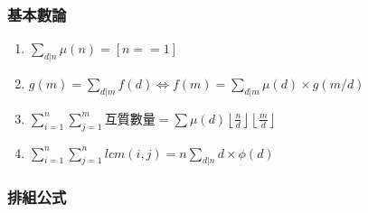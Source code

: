 \subsubsection{基本數論}
\begin{enumerate}\itemsep = -3pt
	\item $\sum_{d|n} \mu (n)=[n==1]$
	\item $g(m)=\sum_{d|m}f(d)\Leftrightarrow f(m)=\sum_{d|m}\mu (d) \times g(m/d)$
	\item $\sum_{i=1}^n\sum_{j=1}^m$互質數量$=\sum \mu (d)\left \lfloor \frac{n}{d} \right \rfloor \left \lfloor \frac{m}{d} \right \rfloor$
	\item $\sum_{i=1}^n\sum_{j=1}^nlcm(i,j)=n\sum_{d|n} d \times \phi (d)$
\end{enumerate}

\subsubsection{排組公式}
